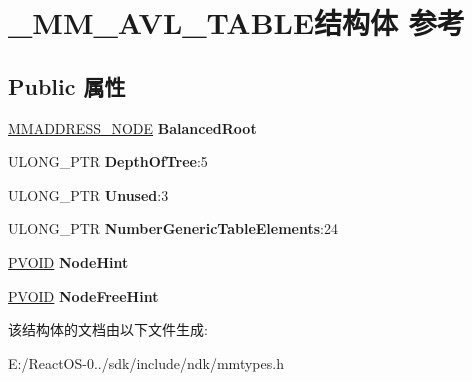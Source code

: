 \hypertarget{struct___m_m___a_v_l___t_a_b_l_e}{}\section{\+\_\+\+M\+M\+\_\+\+A\+V\+L\+\_\+\+T\+A\+B\+L\+E结构体 参考}
\label{struct___m_m___a_v_l___t_a_b_l_e}
\subsection*{Public 属性}
\begin{DoxyCompactItemize}
\item 
\mbox{\label{struct___m_m___a_v_l___t_a_b_l_e_ae5f26489ed7d3dc29e2ab6957f9bb2e0}} 
\hyperlink{struct___m_m_a_d_d_r_e_s_s___n_o_d_e}{M\+M\+A\+D\+D\+R\+E\+S\+S\+\_\+\+N\+O\+DE} {\bfseries Balanced\+Root}
\item 
\mbox{\label{struct___m_m___a_v_l___t_a_b_l_e_a9ecdb78c013df4dfc2f40549affce321}} 
U\+L\+O\+N\+G\+\_\+\+P\+TR {\bfseries Depth\+Of\+Tree}\+:5
\item 
\mbox{\label{struct___m_m___a_v_l___t_a_b_l_e_a745e1b2b0e9a55a63f12469912763042}} 
U\+L\+O\+N\+G\+\_\+\+P\+TR {\bfseries Unused}\+:3
\item 
\mbox{\label{struct___m_m___a_v_l___t_a_b_l_e_acd6e88e82b2d41d76db396ad58583ecd}} 
U\+L\+O\+N\+G\+\_\+\+P\+TR {\bfseries Number\+Generic\+Table\+Elements}\+:24
\item 
\mbox{\label{struct___m_m___a_v_l___t_a_b_l_e_aa0286a954030fdaaa2d020c94fe4cf4c}} 
\hyperlink{interfacevoid}{P\+V\+O\+ID} {\bfseries Node\+Hint}
\item 
\mbox{\label{struct___m_m___a_v_l___t_a_b_l_e_aac8c386ed158df039fd794b1fadd7776}} 
\hyperlink{interfacevoid}{P\+V\+O\+ID} {\bfseries Node\+Free\+Hint}
\end{DoxyCompactItemize}


该结构体的文档由以下文件生成\+:\begin{DoxyCompactItemize}
\item 
E\+:/\+React\+O\+S-\/0../sdk/include/ndk/mmtypes.\+h\end{DoxyCompactItemize}
